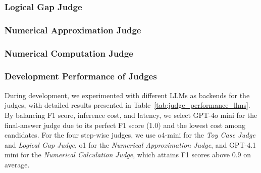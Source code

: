 




\subsubsection{Logical Gap Judge}
\label{app:logical_gap_appendix}





\subsubsection{Numerical Approximation Judge}
\label{app:approximation_judge_appendix}




\subsubsection{Numerical Computation Judge}
\label{app:computation_judge_appendix}





\subsubsection{Development Performance of Judges}
\label{app:judge_dev_performance}




During development, we experimented with different LLMs as backends for the judges, with detailed results presented in Table~\ref{tab:judge_performance_llms}. By balancing F1 score, inference cost, and latency, we select GPT-4o mini for the final-answer judge due to its perfect F1 score (1.0) and the lowest cost among candidates. For the four step-wise judges, we use o4-mini for the \textit{Toy Case Judge} and \textit{Logical Gap Judge}, o1 for the \textit{Numerical Approximation Judge}, and GPT-4.1 mini for the \textit{Numerical Calculation Judge}, which attains F1 scores above 0.9 on average.

